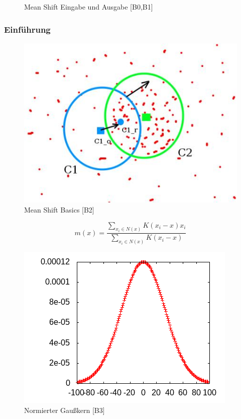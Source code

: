 \documentclass[10pt,utf8]{beamer}
\begin{document}
\begin{frame}
\begin{figure}[p!]
			\caption{Mean Shift Eingabe und Ausgabe [B0,B1]}
		\end{figure}
\end{frame}
\begin{frame}
	\frametitle{Einf\"uhrung}
\begin{figure}
	\includegraphics[scale=0.6]{meanshift_basics.jpg}
	\vspace{-10pt}
	\caption{Mean Shift Basics [B2]}
\end{figure}
\end{frame}
\begin{frame}
 		\[ m(x) = \frac{\sum_{x_i \in N(x)} K(x_i - x) x_i }{\sum_{x_i \in N(x)} K(x_i - x)} \]
\begin{figure}
    \begin{columns}%
        \begin{column}{0.5\textwidth}%
	  \includegraphics[scale=0.7]{../output/pics/gauss.png}
        \end{column}%
        \begin{column}{0.7\textwidth}%
			\vspace{-10pt}
			\hspace{35pt}
		\caption{Normierter Gaußkern [B3]}
        \end{column}%
    \end{columns}
\end{figure}
\end{frame}
\end{document}
